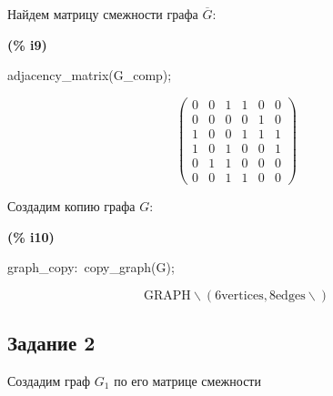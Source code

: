 \documentclass[fleqn]{article}
\begin{document}
Найдем матрицу смежности графа $\overline{G}$:\\
\noindent
\begin{minipage}[t]{4.000000em}\color{red}\bfseries
(\% i9)	
\end{minipage}
\begin{minipage}[t]{\textwidth}\color{blue}
adjacency\_matrix(G\_comp);
\end{minipage}
\[\displaystyle \tag{\% o9} 
\begin{pmatrix}0 & 0 & 1 & 1 & 0 & 0\\
0 & 0 & 0 & 0 & 1 & 0\\
1 & 0 & 0 & 1 & 1 & 1\\
1 & 0 & 1 & 0 & 0 & 1\\
0 & 1 & 1 & 0 & 0 & 0\\
0 & 0 & 1 & 1 & 0 & 0\end{pmatrix}\mbox{}
\]

Создадим копию графа $G$:\\
\noindent
\begin{minipage}[t]{4.000000em}\color{red}\bfseries
(\% i10)	
\end{minipage}
\begin{minipage}[t]{\textwidth}\color{blue}
graph\_copy:\ copy\_graph(G);
\end{minipage}
\[\displaystyle \tag{graph\_ copy} 
\ensuremath{\mathrm{GRAPH\backslash (6 vertices, 8 edges\backslash )}}\mbox{}
\]

\subsection*{Задание 2}

Создадим граф $G_1$ по его матрице смежности \\
$$
\end{document}
